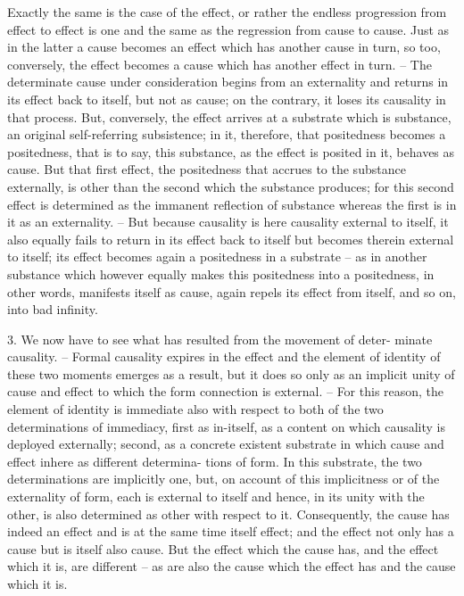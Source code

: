 Exactly the same is the case of the effect, or rather the endless progression
from effect to effect is one and the same as the regression from cause to cause.
Just as in the latter a cause becomes an effect which has another cause
in turn, so too, conversely, the effect becomes a cause which has another
effect in turn. – The determinate cause under consideration begins from
an externality and returns in its effect back to itself, but not as cause;
on the contrary, it loses its causality in that process. But, conversely, the
effect arrives at a substrate which is substance, an original self-referring
subsistence; in it, therefore, that positedness becomes a positedness, that is
to say, this substance, as the effect is posited in it, behaves as cause. But
that first effect, the positedness that accrues to the substance externally, is
other than the second which the substance produces; for this second effect is
determined as the immanent reflection of substance whereas the first is in it
as an externality. – But because causality is here causality external to itself,
it also equally fails to return in its effect back to itself but becomes therein
external to itself; its effect becomes again a positedness in a substrate – as
in another substance which however equally makes this positedness into a
positedness, in other words, manifests itself as cause, again repels its effect
from itself, and so on, into bad infinity.

3. We now have to see what has resulted from the movement of deter-
minate causality. – Formal causality expires in the effect and the element
of identity of these two moments emerges as a result, but it does so only
as an implicit unity of cause and effect to which the form connection is
external. – For this reason, the element of identity is immediate also with
respect to both of the two determinations of immediacy, first as in-itself,
as a content on which causality is deployed externally; second, as a concrete
existent substrate in which cause and effect inhere as different determina-
tions of form. In this substrate, the two determinations are implicitly one,
but, on account of this implicitness or of the externality of form, each is
external to itself and hence, in its unity with the other, is also determined
as other with respect to it. Consequently, the cause has indeed an effect and
is at the same time itself effect; and the effect not only has a cause but is itself
also cause. But the effect which the cause has, and the effect which it is, are
different – as are also the cause which the effect has and the cause which it
is.

